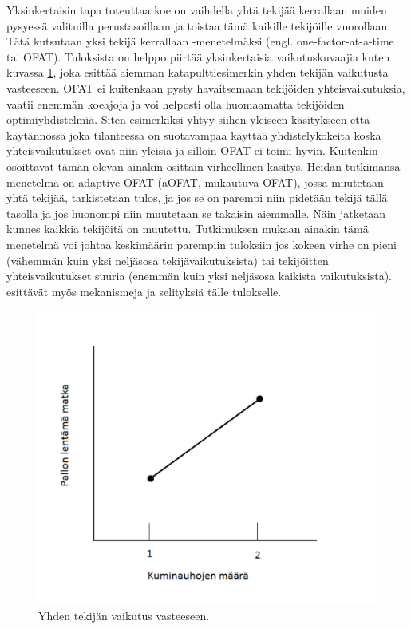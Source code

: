 \documentclass[12pt,a4paper,finnish]{tutthesis}
\begin{document}
Yksinkertaisin tapa toteuttaa koe on vaihdella yhtä tekijää kerrallaan
muiden pysyessä valituilla perustasoillaan ja toistaa
tämä kaikille tekijöille vuorollaan. Tätä kutsutaan
yksi tekijä kerrallaan -menetelmäksi
(engl. one-factor-at-a-time tai OFAT).
Tuloksista on helppo piirtää yksinkertaisia vaikutuskuvaajia
kuten kuvassa \ref{fig:vaikutus}, joka esittää aiemman katapulttiesimerkin yhden tekijän vaikutusta vasteeseen.
OFAT ei kuitenkaan pysty havaitsemaan
tekijöiden yhteisvaikutuksia,
vaatii enemmän koeajoja
ja voi helposti olla huomaamatta tekijöiden optimiyhdistelmiä.
Siten esimerkiksi \textcite{Montgomery2012}
yhtyy siihen yleiseen käsitykseen että käytännössä joka tilanteessa on
suotavampaa käyttää yhdistelykokeita koska yhteisvaikutukset
ovat niin yleisiä ja silloin OFAT ei toimi hyvin.
Kuitenkin \textcite{frey2005mechanisms} osoittavat tämän
olevan ainakin osittain virheellinen käsitys. Heidän tutkimansa
menetelmä on adaptive OFAT (aOFAT, mukautuva OFAT), jossa muutetaan
yhtä tekijää, tarkistetaan tulos, ja jos se on parempi niin
pidetään tekijä tällä tasolla ja jos huonompi niin muutetaan se
takaisin aiemmalle. Näin jatketaan kunnes kaikkia tekijöitä on
muutettu. Tutkimuksen mukaan ainakin tämä menetelmä voi
johtaa keskimäärin parempiin tuloksiin jos kokeen virhe on
pieni (vähemmän kuin yksi neljäsosa tekijävaikutuksista) tai
tekijöitten yhteisvaikutukset suuria (enemmän kuin yksi neljäsosa
kaikista vaikutuksista). \textcite{frey2005mechanisms} esittävät
myös mekanismeja ja selityksiä tälle tulokselle.

\begin{figure}
  \begin{center}
    \includegraphics[scale=0.6]{vaikutus}
  \end{center}
  \caption[Tekijän vaikutuskuvaaja]{Yhden tekijän vaikutus vasteeseen.}
  \label{fig:vaikutus}
\end{figure}
\end{document}
